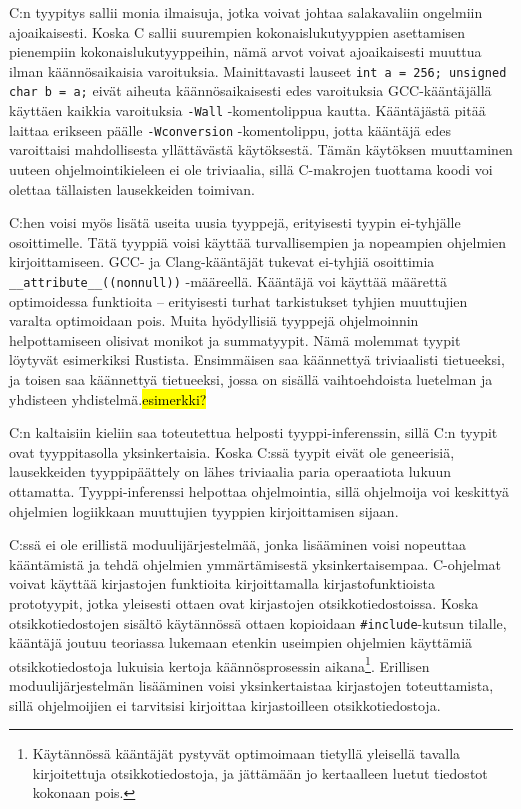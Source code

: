 C:n tyypitys sallii monia ilmaisuja, jotka voivat johtaa salakavaliin
ongelmiin ajoaikaisesti. Koska C sallii suurempien kokonaislukutyyppien
asettamisen pienempiin kokonaislukutyyppeihin, nämä arvot voivat ajoaikaisesti
muuttua ilman käännösaikaisia varoituksia. Mainittavasti lauseet \texttt{int a
= 256; unsigned char b = a;} eivät aiheuta käännösaikaisesti edes varoituksia
GCC-kääntäjällä käyttäen kaikkia varoituksia \texttt{-Wall} -komentolippua
kautta. Kääntäjästä pitää laittaa erikseen päälle \texttt{-Wconversion}
-komentolippu, jotta kääntäjä edes varoittaisi mahdollisesta yllättävästä
käytöksestä. Tämän käytöksen muuttaminen uuteen ohjelmointikieleen ei ole
triviaalia, sillä C-makrojen tuottama koodi voi olettaa tällaisten lausekkeiden
toimivan.

C:hen voisi myös lisätä useita uusia tyyppejä, erityisesti tyypin ei-tyhjälle
osoittimelle. Tätä tyyppiä voisi käyttää turvallisempien ja nopeampien
ohjelmien kirjoittamiseen. GCC- ja Clang-kääntäjät tukevat ei-tyhjiä osoittimia
\texttt{\_\_attribute\_\_((nonnull))} -määreellä. Kääntäjä voi käyttää määrettä
optimoidessa funktioita -- erityisesti turhat tarkistukset tyhjien muuttujien
varalta optimoidaan pois. Muita hyödyllisiä tyyppejä ohjelmoinnin
helpottamiseen olisivat monikot ja summatyypit. Nämä molemmat tyypit löytyvät esimerkiksi Rustista.
Ensimmäisen saa käännettyä triviaalisti tietueeksi, ja toisen saa käännettyä
tietueeksi, jossa on sisällä vaihtoehdoista luetelman ja
yhdisteen yhdistelmä.\hl{esimerkki?}

C:n kaltaisiin kieliin saa toteutettua helposti tyyppi-inferenssin, sillä C:n
tyypit ovat tyyppitasolla yksinkertaisia. Koska C:ssä tyypit eivät ole
geneerisiä, lausekkeiden tyyppipäättely on lähes triviaalia paria operaatiota
lukuun ottamatta. Tyyppi-inferenssi helpottaa ohjelmointia, sillä ohjelmoija
voi keskittyä ohjelmien logiikkaan muuttujien tyyppien kirjoittamisen sijaan.

C:ssä ei ole erillistä moduulijärjestelmää, jonka lisääminen voisi nopeuttaa
kääntämistä ja tehdä ohjelmien ymmärtämisestä yksinkertaisempaa. C-ohjelmat
voivat käyttää kirjastojen funktioita kirjoittamalla kirjastofunktioista
prototyypit, jotka yleisesti ottaen ovat kirjastojen otsikkotiedostoissa. Koska
otsikkotiedostojen sisältö käytännössä ottaen kopioidaan
\texttt{\#include}-kutsun tilalle, kääntäjä joutuu teoriassa lukemaan etenkin
useimpien ohjelmien käyttämiä otsikkotiedostoja lukuisia kertoja
käännösprosessin aikana\footnote{Käytännössä kääntäjät pystyvät optimoimaan
tietyllä yleisellä tavalla kirjoitettuja otsikkotiedostoja, ja jättämään jo
kertaalleen luetut tiedostot kokonaan pois.}. Erillisen moduulijärjestelmän
lisääminen voisi yksinkertaistaa kirjastojen toteuttamista, sillä ohjelmoijien
ei tarvitsisi kirjoittaa kirjastoilleen otsikkotiedostoja. 

